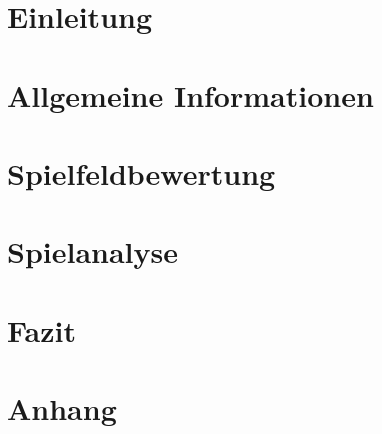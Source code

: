 \documentclass[12pt,a4paper,bibliography=totocnumbered,listof=totocnumbered]{article}
\begin{document}
\section{Einleitung}\label{sec:einleitung}


\section{Allgemeine Informationen}\label{sec:allgemeine-informationen}


\section{Spielfeldbewertung}\label{sec:spielfeldbewertung}


\section{Spielanalyse}\label{sec:spielanalyse}


\section{Fazit}\label{sec:fazit}


\section{Anhang}\label{sec:anhang}

\end{document}
